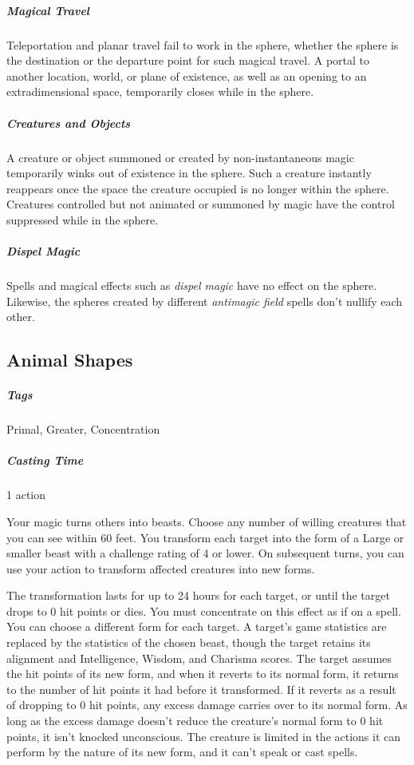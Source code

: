 \subparagraph*{Magical Travel} Teleportation and planar travel fail to work in the sphere, whether the sphere is the destination or the departure point for such magical travel. A portal to another location, world, or plane of existence, as well as an opening to an extradimensional space, temporarily closes while in the sphere.

\subparagraph*{Creatures and Objects} A creature or object summoned or created by non-instantaneous magic temporarily winks out of existence in the sphere. Such a creature instantly reappears once the space the creature occupied is no longer within the sphere. Creatures controlled but not animated or summoned by magic have the control suppressed while in the sphere.

\subparagraph*{Dispel Magic} Spells and magical effects such as \textit{dispel magic} have no effect on the sphere. Likewise, the spheres created by different \textit{antimagic field} spells don’t nullify each other.

\subsection{Animal Shapes\label{spell:animal-shapes}}
\subparagraph*{Tags} Primal, Greater, Concentration
\subparagraph*{Casting Time} 1 action

Your magic turns others into beasts. Choose any number of willing creatures that you can see within 60 feet. You transform each target into the form of a Large or smaller beast with a challenge rating of 4 or lower. On subsequent turns, you can use your action to transform affected creatures into new forms.

The transformation lasts for up to 24 hours for each target, or until the target drops to 0 hit points or dies. You must concentrate on this effect as if on a spell. You can choose a different form for each target. A target’s game statistics are replaced by the statistics of the chosen beast, though the target retains its alignment and Intelligence, Wisdom, and Charisma scores. The target assumes the hit points of its new form, and when it reverts to its normal form, it returns to the number of hit points it had before it transformed. If it reverts as a result of dropping to 0 hit points, any excess damage carries over to its normal form. As long as the excess damage doesn’t reduce the creature’s normal form to 0 hit points, it isn’t knocked unconscious. The creature is limited in the actions it can perform by the nature of its new form, and it can’t speak or cast spells.

